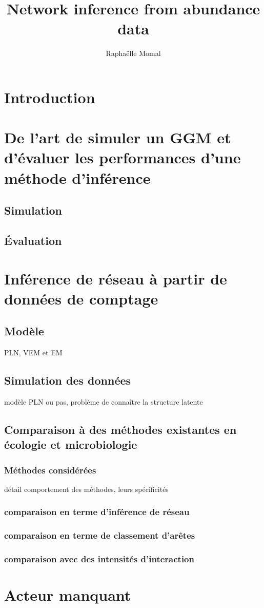 \documentclass[11pt,a4paper]{book}
\author{Rapha\"{e}lle Momal}
\title{Network inference from abundance data }
\begin{document}
\maketitle
\chapter{Introduction}


\chapter{De l'art de simuler un GGM et d'évaluer les performances d'une méthode d'inférence}
	\section{Simulation}


	\section{Évaluation}
	
\chapter{Inférence de réseau à partir de données de comptage}
	\section{Modèle}
	PLN, VEM et EM
	\section{Simulation des données}
modèle PLN ou pas, problème de connaître la structure latente

	\section{Comparaison à des méthodes existantes en écologie et microbiologie}
	\subsection{Méthodes considérées}
	
	détail comportement des méthodes, leurs spécificités
	
	\subsection{comparaison en terme d'inférence de réseau}
	\subsection{comparaison en terme de classement d'arêtes}
	\subsection{comparaison avec des intensités d'interaction}
	
\chapter{Acteur manquant}
\end{document}
